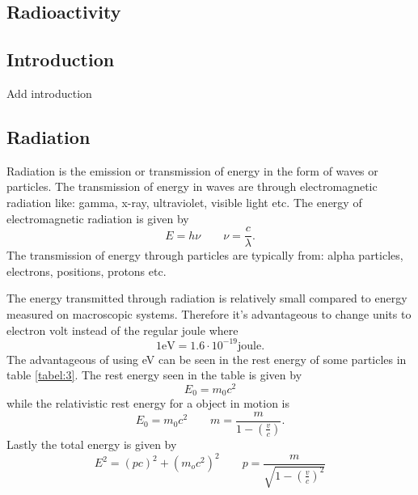 \documentclass[jmp, amsmath, amssymb, reprint]{article}
\numberwithin{equation}{section}
\newcommand{\lp}{\left(}
\newcommand{\rp}{\right)}
\begin{document}
\begin{multicols}{2}
\clearpage

\section{Radioactivity}

\subsection*{Introduction}

Add introduction

\subsection{Radiation}

Radiation is the emission or transmission of energy in the form of waves or particles. The transmission of energy in waves are through electromagnetic radiation like: gamma, x-ray, ultraviolet, visible light etc. The energy of electromagnetic radiation is given by
\begin{equation}
E=h\nu \qquad \nu = \frac{c}{\lambda}.
\end{equation}
The transmission of energy through particles are typically from: alpha particles, electrons, positions, protons etc.

The energy transmitted through radiation is relatively small compared to energy measured on macroscopic systems. Therefore it's advantageous to change units to electron volt instead of the regular joule where
\begin{equation}
1\text{eV}=1.6\cdot 10^{-19}\text{joule}.
\end{equation}
The advantageous of using eV can be seen in the rest energy of some particles in table \ref{tabel:3}. The rest energy seen in the table is given by
\begin{equation}
E_0=m_0c^2
\end{equation}
while the relativistic rest energy for a object in motion is
\begin{equation}
E_0=m_0c^2\qquad m=\dfrac{m}{1-\lp\frac{v}{c}\rp}.
\end{equation}
Lastly the total energy is given by
\begin{equation}
E^2=\lp pc\rp^2 + \lp m_oc^2\rp^2\qquad p=\frac{m}{\sqrt{1-\lp\frac{v}{c}\rp^2}}
\end{equation}


\end{multicols}
\end{document}
